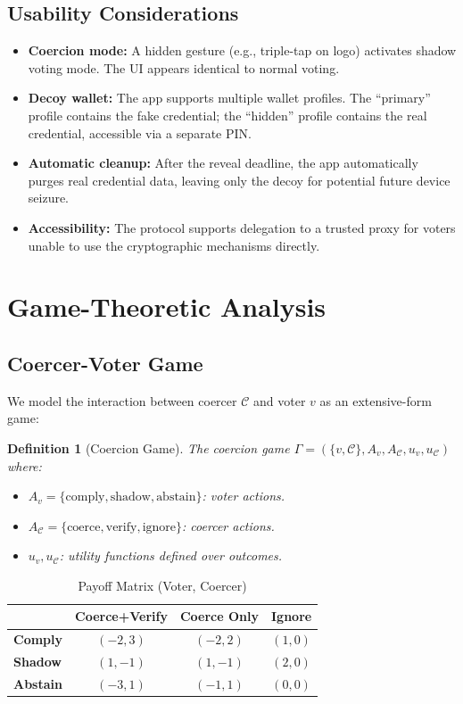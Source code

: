 \documentclass[11pt,a4paper]{article}
\newcommand{\CC}{\mathcal{C}}
\newtheorem{definition}{Definition}
\begin{document}
\subsection{Usability Considerations}

\begin{itemize}
    \item \textbf{Coercion mode:} A hidden gesture (e.g., triple-tap on logo) activates shadow voting mode. The UI appears identical to normal voting.
    \item \textbf{Decoy wallet:} The app supports multiple wallet profiles. The ``primary'' profile contains the fake credential; the ``hidden'' profile contains the real credential, accessible via a separate PIN.
    \item \textbf{Automatic cleanup:} After the reveal deadline, the app automatically purges real credential data, leaving only the decoy for potential future device seizure.
    \item \textbf{Accessibility:} The protocol supports delegation to a trusted proxy for voters unable to use the cryptographic mechanisms directly.
\end{itemize}

\section{Game-Theoretic Analysis}

\subsection{Coercer-Voter Game}

We model the interaction between coercer $\CC$ and voter $v$ as an extensive-form game:

\begin{definition}[Coercion Game]
The coercion game $\Gamma = (\{v, \CC\}, A_v, A_\CC, u_v, u_\CC)$ where:
\begin{itemize}
    \item $A_v = \{\text{comply}, \text{shadow}, \text{abstain}\}$: voter actions.
    \item $A_\CC = \{\text{coerce}, \text{verify}, \text{ignore}\}$: coercer actions.
    \item $u_v, u_\CC$: utility functions defined over outcomes.
\end{itemize}
\end{definition}

\begin{table}[H]
\centering
\caption{Payoff Matrix (Voter, Coercer)}
\label{tab:payoff}
\begin{tabular}{lccc}
\toprule
& \textbf{Coerce+Verify} & \textbf{Coerce Only} & \textbf{Ignore} \\
\midrule
\textbf{Comply} & $(-2, 3)$ & $(-2, 2)$ & $(1, 0)$ \\
\textbf{Shadow} & $(1, -1)$ & $(1, -1)$ & $(2, 0)$ \\
\textbf{Abstain} & $(-3, 1)$ & $(-1, 1)$ & $(0, 0)$ \\
\bottomrule
\end{tabular}
\end{table}
\end{document}
